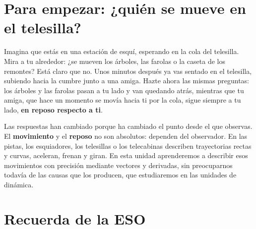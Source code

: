 
\section*{Para empezar: ¿quién se mueve en el telesilla?}

Imagina que estás en una estación de esquí, esperando en la cola del telesilla. Mira a tu alrededor: ¿se mueven los árboles, las
farolas o la caseta de los remontes? Está claro que no. Unos minutos después ya vas sentado en el telesilla, subiendo hacia la
cumbre junto a una amiga. Hazte ahora las mismas preguntas: los árboles y las farolas pasan a tu lado y van quedando atrás, mientras
que tu amiga, que hace un momento se movía hacia ti por la cola, sigue siempre a tu lado, \textbf{en reposo respecto a ti}.

Las respuestas han cambiado porque ha cambiado el punto desde el que observas. El \textbf{movimiento} y el \textbf{reposo} no son
absolutos: dependen del observador. En las pistas, los esquiadores, los telesillas o los telecabinas describen trayectorias rectas y
curvas, aceleran, frenan y giran. En esta unidad aprenderemos a describir esos movimientos con precisión mediante vectores y
derivadas, sin preocuparnos todavía de las causas que los producen, que estudiaremos en las unidades de dinámica.

\section{Recuerda de la ESO}\label{sec:ud8-eso}


